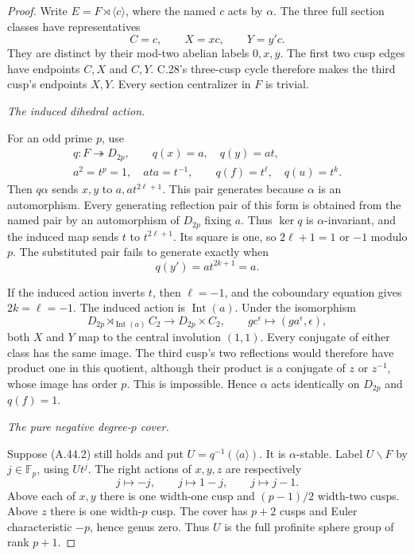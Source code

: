 \begin{proof}
Write \(E=F\rtimes\langle c\rangle\), where
the named \(c\) acts by \(\alpha\). The three
full section classes have representatives
\[
                         C=c,\qquad X=xc,\qquad Y=y'c.
\]
They are distinct by their mod-two abelian labels
\(0,x,y\). The first two cusp edges have endpoints
\(C,X\) and \(C,Y\). C.28's three-cusp cycle
therefore makes the third cusp's endpoints
\(X,Y\). Every section centralizer in \(F\)
is trivial.

\emph{The induced dihedral action.}\par
For an odd prime \(p\), use
\[
 \begin{gathered}
 q:F\twoheadrightarrow D_{2p},\qquad
 q(x)=a,\quad q(y)=at,\\
 a^2=t^p=1,\quad ata=t^{-1},\qquad
 q(f)=t^\ell,\quad q(u)=t^k.
 \end{gathered}
\]
Then \(q\alpha\) sends \(x,y\) to
\(a,at^{2\ell+1}\). This pair generates because
\(\alpha\) is an automorphism. Every generating
reflection pair of this form is obtained from the
named pair by an automorphism of \(D_{2p}\)
fixing \(a\). Thus \(\ker q\) is
\(\alpha\)-invariant, and the induced map sends
\(t\) to \(t^{2\ell+1}\). Its square is one,
so \(2\ell+1=1\) or \(-1\) modulo \(p\).
The substituted pair fails to generate exactly when
\[
                   q(y')=at^{2k+1}=a.
 \tag{A.44.2}
\]

If the induced action inverts \(t\), then
\(\ell=-1\), and the coboundary equation gives
\(2k=\ell=-1\). The induced action is
\(\operatorname{Int}(a)\). Under the isomorphism
\[
 D_{2p}\rtimes_{\operatorname{Int}(a)}C_2
       \longrightarrow D_{2p}\times C_2,\qquad
 gc^\epsilon\longmapsto(ga^\epsilon,\epsilon),
\]
both \(X\) and \(Y\) map to the central
involution \((1,1)\). Every conjugate of either
class has the same image. The third cusp's two
reflections would therefore have product one in
this quotient, although their product is a
conjugate of \(z\) or \(z^{-1}\), whose image
has order \(p\). This is impossible. Hence
\(\alpha\) acts identically on \(D_{2p}\)
and \(q(f)=1\).

\emph{The pure negative degree-\(p\) cover.}\par
Suppose (A.44.2) still holds and put
\(U=q^{-1}(\langle a\rangle)\). It is
\(\alpha\)-stable. Label \(U\backslash F\)
by \(j\in\mathbb F_p\), using \(Ut^j\).
The right actions of \(x,y,z\) are respectively
\[
                     j\mapsto-j,\qquad j\mapsto1-j,
                             \qquad j\mapsto j-1.
 \tag{A.44.3}
\]
Above each of \(x,y\) there is one width-one
cusp and \((p-1)/2\) width-two cusps. Above
\(z\) there is one width-\(p\) cusp. The
cover has \(p+2\) cusps and Euler characteristic
\(-p\), hence genus zero. Thus \(U\) is the
full profinite sphere group of rank \(p+1\).


\end{proof}
